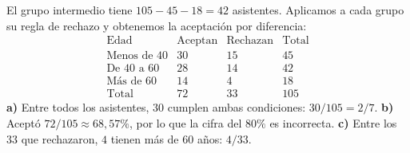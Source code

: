 El grupo intermedio tiene $105-45-18=42$ asistentes. Aplicamos a cada grupo su regla de rechazo y obtenemos la aceptación por diferencia:
\[
\begin{array}{l|rrr}
\text{Edad}&\text{Aceptan}&\text{Rechazan}&\text{Total}\\\hline
\text{Menos de 40}&30&15&45\\
\text{De 40 a 60}&28&14&42\\
\text{Más de 60}&14&4&18\\\hline
\text{Total}&72&33&105
\end{array}
\]
\textbf{a)} Entre todos los asistentes, $30$ cumplen ambas condiciones: $30/105=\boxed{2/7}$.
\textbf{b)} Aceptó $72/105\approx68{,}57\%$, por lo que la cifra del $80\%$ es incorrecta.
\textbf{c)} Entre los $33$ que rechazaron, $4$ tienen más de $60$ años: $\boxed{4/33}$.
